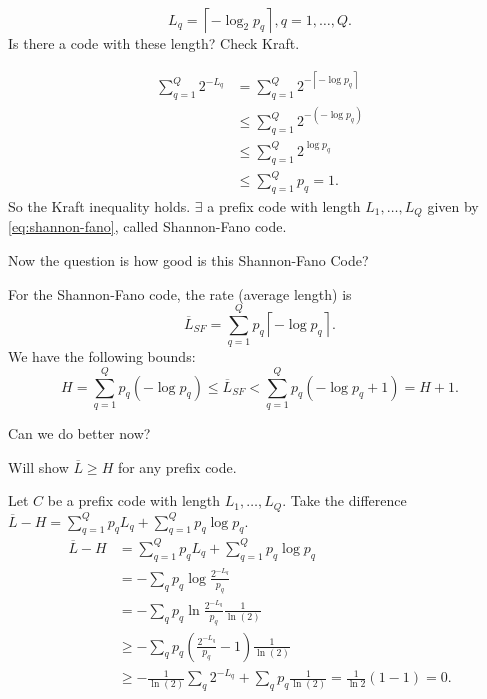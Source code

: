 \documentclass{report}
\newcommand{\ceil}[1]{\left\lceil #1 \right\rceil}
\theoremstyle{definition}
\theoremstyle{remark}
\numberwithin{equation}{section}
\begin{document}
\begin{equation}\label{eq:shannon-fano}
  L_q = \ceil{-\log_2 p_q}, q = 1, \ldots, Q.  
\end{equation}
Is there a code with these length? Check Kraft.

\begin{align*}
  \sum_{q=1}^Q 2^{-L_q} & = \sum_{q=1}^Q 2^{-\ceil{-\log p_q}} \\
  & \leq \sum_{q=1}^Q 2^{-(-\log p_q)} \\
  & \leq \sum_{q=1}^Q 2^{\log p_q} \\
  & \leq \sum_{q=1}^Q p_q = 1.
\end{align*}
So the Kraft inequality holds. $\exists$ a prefix code with length $L_1, \ldots, L_Q$ given by \eqref{eq:shannon-fano}, called Shannon-Fano code.

Now the question is how good is this Shannon-Fano Code?

For the Shannon-Fano code, the rate (average length) is \[
  \overline{L}_{SF} = \sum_{q=1}^Q p_q\ceil{-\log p_q}.  
\]
We have the following bounds:
\[
  H = \sum_{q=1}^Q p_q(-\log p_q) \leq \overline{L}_{SF} < \sum_{q=1}^Q p_q(-\log p_q + 1) = H+1.
\]

Can we do better now?

Will show $\overline{L} \geq H$ for any prefix code.

Let $C$ be a prefix code with length $L_1, \ldots, L_Q$. Take the difference $\overline{L}- H = \sum_{q=1}^Q p_qL_q + \sum_{q=1}^Q p_q \log p_q$.
\begin{align*}
  \overline{L} - H & = \sum_{q=1}^Q p_qL_q + \sum_{q=1}^Q p_q \log p_q \\
  & = -\sum_q p_q \log \frac{2^{-L_q}}{p_q} \\
  & = -\sum_q p_q \ln \frac{2^{-L_q}}{p_q} \frac{1}{\ln(2)} \\
  & \geq -\sum_q p_q \left(\frac{2^{-L_q}}{p_q} - 1\right)\frac{1}{\ln(2)}  \\
  & \geq -\frac{1}{\ln(2)}\sum_q 2^{-L_q} + \sum_q p_q \frac{1}{\ln(2)} = \frac{1}{\ln 2}(1 - 1) = 0.
\end{align*}
 
\end{document}

